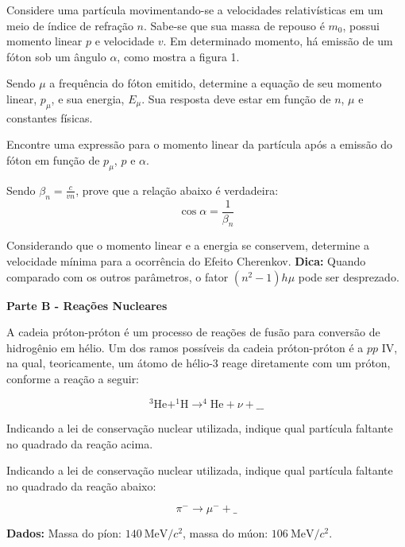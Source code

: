\documentclass[11pt]{article}
\begin{document}
\begin{pproblem}
    Considere uma partícula movimentando-se a velocidades relativísticas em um meio de índice de
    refração $n$. Sabe-se que sua massa de repouso é $m_0$, possui momento linear $p$ e velocidade $v$. Em
    determinado momento, há emissão de um fóton sob um ângulo $\alpha$, como mostra a figura 1.

    \begin{alternativas}
        \item Sendo $\mu$ a frequência do fóton emitido, determine a equação de seu momento
        linear, $p_\mu$, e sua energia, $E_\mu$. Sua resposta deve estar em função de $n$, $\mu$ e constantes físicas.
        \item Encontre uma expressão para o momento linear da partícula após a emissão
    do fóton em função de $p_\mu$, $p$ e $\alpha$.
        \item Sendo $\beta_n = \frac{c}{vn}$, prove que a relação abaixo é verdadeira:
        \begin{equation}
            \cos\alpha = \frac{1}{\beta_n}
        \end{equation}
        \item Considerando que o momento linear e a energia se conservem, determine a
        velocidade mínima para a ocorrência do Efeito Cherenkov.
        \textbf{Dica:} Quando comparado com os outros parâmetros, o fator $(n^2-1)h\mu$ pode ser desprezado.

    \begin{center}
        \textbf{Parte B - Reações Nucleares}    
    \end{center}
    
    A cadeia próton-próton é um processo de reações de fusão para conversão de hidrogênio em hélio.
    Um dos ramos possíveis da cadeia próton-próton é a $pp \text{ IV}$, na qual, teoricamente, um átomo de
    hélio-3 reage diretamente com um próton, conforme a reação a seguir:

    \begin{equation}
        ^3\text{He} + ^1\text{H} \rightarrow ^4\text{He} + \nu + \_\_
    \end{equation}

        \item  Indicando a lei de conservação nuclear utilizada, indique qual partícula faltante
        no quadrado da reação acima.

        \item  Indicando a lei de conservação nuclear utilizada, indique qual partícula faltante
        no quadrado da reação abaixo:

        \begin{equation}
            \pi^- \rightarrow \mu^- + \_
        \end{equation}
        
        \textbf{Dados:} Massa do píon: $140 \ \text{MeV}/c^2$, massa do múon: $106 \ \text{MeV}/c^2$.
    \end{alternativas}


\end{pproblem}
\end{document}
